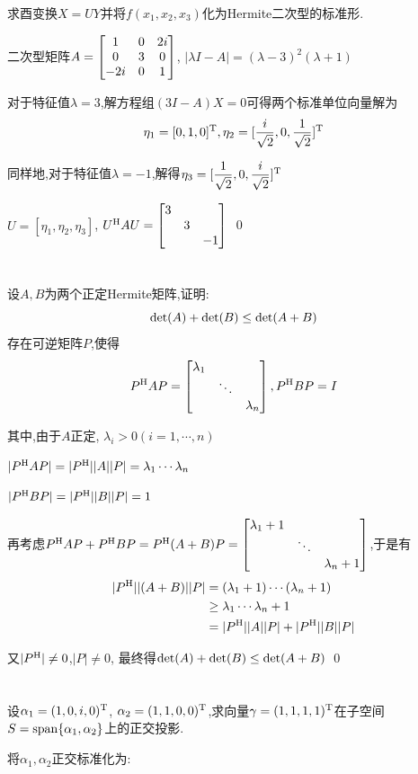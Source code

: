 \documentclass{matrix-homework}
\begin{document}
求酉变换$X=UY$并将$f(x_1,x_2,x_3)$化为Hermite二次型的标准形.

\answer
二次型矩阵$A=\begin{bmatrix}1&0&2i\\0&3&0\\-2i&0&1\end{bmatrix}$, $|\lambda I - A|=(\lambda-3)^2(\lambda+1)$

对于特征值$\lambda=3$,解方程组$(3I-A)X=0$可得两个标准单位向量解为
$$\eta_1=[0,1,0]^{\mathrm{T}}, \eta_2=[\frac{i}{\sqrt{2}},0,\frac{1}{\sqrt{2}}]^{\mathrm{T}}$$

同样地,对于特征值$\lambda=-1$,解得$\eta_3=[\dfrac{1}{\sqrt{2}},0,\dfrac{i}{\sqrt{2}}]^{\mathrm{T}}$

$U=[\eta_1,\eta_2,\eta_3]$, $U^{\mathrm{H}} AU=\begin{bmatrix}3\\&3\\&&-1\end{bmatrix}$
\qed


\section{}
设$A,B$为两个正定Hermite矩阵,证明:
$$\mathrm{det}(A)+\mathrm{det}(B)\le\mathrm{det}(A+B)$$
\answer
存在可逆矩阵$P$,使得
$$P^{\mathrm{H}} AP=\begin{bmatrix}\lambda_1\\&\ddots\\&&\lambda_n\end{bmatrix},P^{\mathrm{H}} BP=I$$

其中,由于$A$正定, $\lambda_i > 0 (i=1,\cdots,n)$

$|P^{\mathrm{H}} AP|= |P^{\mathrm{H}}||A||P|=\lambda_1\cdots\lambda_n$

$|P^{\mathrm{H}} BP|=|P^{\mathrm{H}}||B||P|=1$

再考虑$P^{\mathrm{H}} AP + P^{\mathrm{H}} BP = P^{\mathrm{H}} (A+B)P=\begin{bmatrix}\lambda_1+1\\&\ddots\\&&\lambda_n+1\end{bmatrix}$,于是有
\begin{align*}
    |P^{\mathrm{H}}|| (A+B)||P| & =(\lambda_1+1)\cdots(\lambda_n+1) \\
                       & \ge \lambda_1\cdots\lambda_n + 1  \\
                       & = |P^{\mathrm{H}}||A||P| + |P^{\mathrm{H}}||B||P|
\end{align*}

又$|P^{\mathrm{H}}| \ne 0$,$|P|\ne0$, 最终得$\mathrm{det}(A)+\mathrm{det}(B)\le\mathrm{det}(A+B)$
\qed

\newpage
\section{}
设$\alpha_1=(1,0,i,0)^{\mathrm{T}}$, $\alpha_2=(1,1,0,0)^{\mathrm{T}}$,求向量$\gamma=(1,1,1,1)^{\mathrm{T}}$在子空间$S=\mathrm{span}\{\alpha_1,\alpha_2\}$上的正交投影.

\answer
将$\alpha_1,\alpha_2$正交标准化为:
\end{document}

